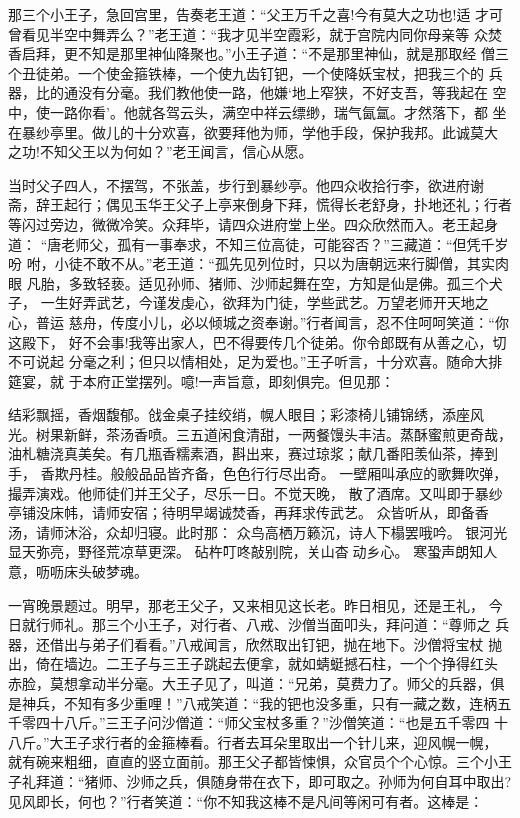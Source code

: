 那三个小王子，急回宫里，告奏老王道：“父王万千之喜!今有莫大之功也!适
才可曾看见半空中舞弄么？”老王道：“我才见半空霞彩，就于宫院内同你母亲等
众焚香启拜，更不知是那里神仙降聚也。”小王子道：“不是那里神仙，就是那取经
僧三个丑徒弟。一个使金箍铁棒，一个使九齿钉钯，一个使降妖宝杖，把我三个的
兵器，比的通没有分毫。我们教他使一路，他嫌‘地上窄狭，不好支吾，等我起在
空中，使一路你看’。他就各驾云头，满空中祥云缥缈，瑞气氤氲。才然落下，都
坐在暴纱亭里。做儿的十分欢喜，欲要拜他为师，学他手段，保护我邦。此诚莫大
之功!不知父王以为何如？”老王闻言，信心从愿。

当时父子四人，不摆驾，不张盖，步行到暴纱亭。他四众收拾行李，欲进府谢
斋，辞王起行；偶见玉华王父子上亭来倒身下拜，慌得长老舒身，扑地还礼；行者
等闪过旁边，微微冷笑。众拜毕，请四众进府堂上坐。四众欣然而入。老王起身道：
“唐老师父，孤有一事奉求，不知三位高徒，可能容否？”三藏道：“但凭千岁吩
咐，小徒不敢不从。”老王道：“孤先见列位时，只以为唐朝远来行脚僧，其实肉眼
凡胎，多致轻亵。适见孙师、猪师、沙师起舞在空，方知是仙是佛。孤三个犬子，
一生好弄武艺，今谨发虔心，欲拜为门徒，学些武艺。万望老师开天地之心，普运
慈舟，传度小儿，必以倾城之资奉谢。”行者闻言，忍不住呵呵笑道：“你这殿下，
好不会事!我等出家人，巴不得要传几个徒弟。你令郎既有从善之心，切不可说起
分毫之利；但只以情相处，足为爱也。”王子听言，十分欢喜。随命大排筵宴，就
于本府正堂摆列。噫!一声旨意，即刻俱完。但见那：

结彩飘摇，香烟馥郁。戗金桌子挂绞绡，幌人眼目；彩漆椅儿铺锦绣，添座风
光。树果新鲜，茶汤香喷。三五道闲食清甜，一两餐馒头丰洁。蒸酥蜜煎更奇哉，
油札糖浇真美矣。有几瓶香糯素酒，斟出来，赛过琼浆；献几番阳羡仙茶，捧到手，
香欺丹桂。般般品品皆齐备，色色行行尽出奇。
一壁厢叫承应的歌舞吹弹，撮弄演戏。他师徒们并王父子，尽乐一日。不觉天晚，
散了酒席。又叫即于暴纱亭铺没床帏，请师安宿；待明早竭诚焚香，再拜求传武艺。
众皆听从，即备香汤，请师沐浴，众却归寝。此时那：
众鸟高栖万籁沉，诗人下榻罢哦吟。
银河光显天弥亮，野径荒凉草更深。
砧杵叮咚敲别院，关山杳动乡心。
寒蛩声朗知人意，呖呖床头破梦魂。

一宵晚景题过。明早，那老王父子，又来相见这长老。昨日相见，还是王礼，
今日就行师礼。那三个小王子，对行者、八戒、沙僧当面叩头，拜问道：“尊师之
兵器，还借出与弟子们看看。”八戒闻言，欣然取出钉钯，抛在地下。沙僧将宝杖
抛出，倚在墙边。二王子与三王子跳起去便拿，就如蜻蜓撼石柱，一个个挣得红头
赤脸，莫想拿动半分毫。大王子见了，叫道：“兄弟，莫费力了。师父的兵器，俱
是神兵，不知有多少重哩！”八戒笑道：“我的钯也没多重，只有一藏之数，连柄五
千零四十八斤。”三王子问沙僧道：“师父宝杖多重？”沙僧笑道：“也是五千零四
十八斤。”大王子求行者的金箍棒看。行者去耳朵里取出一个针儿来，迎风幌一幌，
就有碗来粗细，直直的竖立面前。那王父子都皆悚惧，众官员个个心惊。三个小王
子礼拜道：“猪师、沙师之兵，俱随身带在衣下，即可取之。孙师为何自耳中取出?
见风即长，何也？”行者笑道：“你不知我这棒不是凡间等闲可有者。这棒是：

